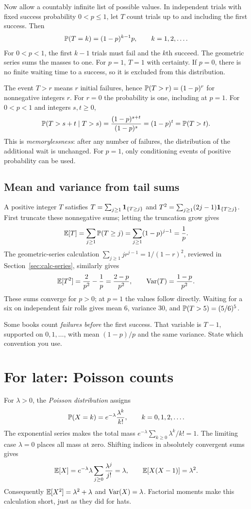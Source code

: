 Now allow a countably infinite list of possible values.
In independent trials with fixed success probability $0<p\le1$,
let $T$ count trials up to and including the first success. Then
\[
 \P(T=k)=(1-p)^{k-1}p,\qquad k=1,2,\ldots.
\]
For $0<p<1$, the first $k-1$ trials must fail and the $k$th succeed.
The geometric series sums the masses to one.
For $p=1$, $T=1$ with certainty. If $p=0$, there is no finite waiting
time to a success, so it is excluded from this distribution.

The event $T>r$ means $r$ initial failures, hence
$\P(T>r)=(1-p)^r$ for nonnegative integers $r$.
For $r=0$ the probability is one, including at $p=1$.
For $0<p<1$ and integers $s,t\ge0$,
\[
 \P(T>s+t\mid T>s)
 =\frac{(1-p)^{s+t}}{(1-p)^s}
 =(1-p)^t=\P(T>t).
\]
This is \emph{memorylessness}: after any number of failures, the
distribution of the additional wait is unchanged.
For $p=1$, only conditioning events of positive probability can be used.

\subsection*{Mean and variance from tail sums}
A positive integer $T$ satisfies
$T=\sum_{j\ge1}\ind_{\{T\ge j\}}$ and
$T^2=\sum_{j\ge1}(2j-1)\ind_{\{T\ge j\}}$.
First truncate these nonnegative sums; letting the truncation grow gives
\[
 \E[T]=\sum_{j\ge1}\P(T\ge j)=\sum_{j\ge1}(1-p)^{j-1}=\frac1p.
\]
The geometric-series calculation
$\sum_{j\ge1}j r^{j-1}=1/(1-r)^2$, reviewed in
Section~\ref{sec:calc-series}, similarly gives
\[
 \E[T^2]=\frac2{p^2}-\frac1p=\frac{2-p}{p^2},
 \qquad \Var(T)=\frac{1-p}{p^2}.
\]
These sums converge for $p>0$; at $p=1$ the values follow directly.
Waiting for a six on independent fair rolls gives mean $6$,
variance $30$, and $\P(T>5)=(5/6)^5$.

\begin{warningbox}
Some books count \emph{failures before} the first success.
That variable is $T-1$, supported on $0,1,\ldots$, with mean
$(1-p)/p$ and the same variance. State which convention you use.
\end{warningbox}

\section{For later: Poisson counts}
\label{sec:poisson}

For $\lambda>0$, the \emph{Poisson distribution} assigns
\[
 \P(X=k)=e^{-\lambda}\frac{\lambda^k}{k!},
 \qquad k=0,1,2,\ldots.
\]
The exponential series makes the total mass
$e^{-\lambda}\sum_{k\ge0}\lambda^k/k!=1$.
The limiting case $\lambda=0$ places all mass at zero.
Shifting indices in absolutely convergent sums gives
\[
 \E[X]=e^{-\lambda}\lambda\sum_{j\ge0}\frac{\lambda^j}{j!}
 =\lambda,\qquad
 \E[X(X-1)]=\lambda^2.
\]
Consequently $\E[X^2]=\lambda^2+\lambda$ and $\Var(X)=\lambda$.
Factorial moments make this calculation short, just as they did for hats.

